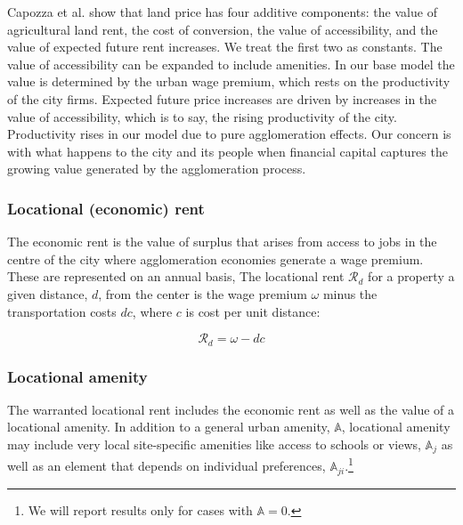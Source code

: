 Capozza et al. \cite{capozzaFundamentalsLandPrices1989} show that land price has four additive components: the value of agricultural land rent, the cost of conversion, the value of accessibility, and the value of expected future rent increases. We treat the first two as constants. The value of accessibility  can be expanded to include amenities. In our base model the value is determined by the urban wage premium, which rests on the productivity of the city firms. %
Expected future price increases are driven by increases in the value of accessibility, which is to say, the rising productivity of the city. Productivity rises in our model due to pure agglomeration effects. Our concern is with what happens to the city and its people when financial capital captures the growing value generated by the agglomeration process.  


\subsubsection{Locational (economic) rent} \label{section-economic-rent}
The \gls{economic rent} is the value of surplus that arises from access to jobs in the centre of the city where agglomeration economies generate a wage premium. These are represented  on an annual basis, 
The locational rent $\mathcal{R}_d$ for a property a given distance, $d$, from the center is the wage premium $\omega$ minus the transportation costs $dc$, where $c$ is cost per unit distance:

\[\mathcal{R}_d= \omega - {dc}\]

\subsubsection{Locational amenity} \label{section-locational-rent}
The warranted locational rent includes the economic rent as well as the value of a locational amenity. In addition to a general urban amenity, $\mathbb{A}$, locational amenity may include very local site-specific amenities like access to schools or views, $\mathbb{A}_j$ as well as an element that depends on individual preferences, $\mathbb{A}_{ji}$.\footnote{We will report results only for cases with $\mathbb{A}=0$. }   %

